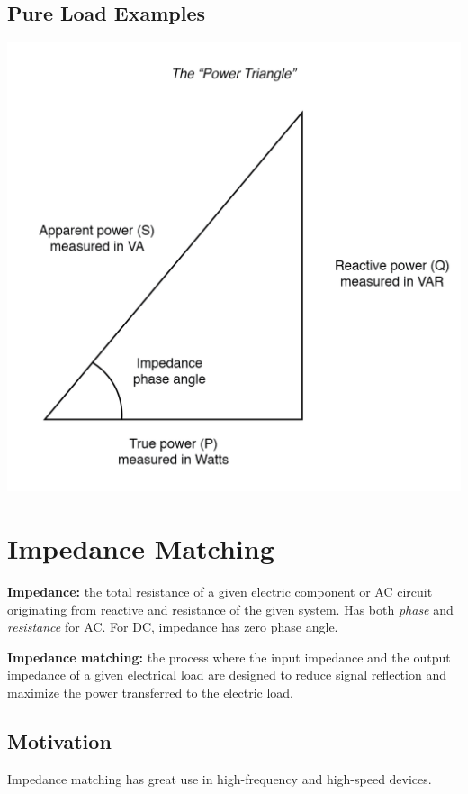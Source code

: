 \subsection{Pure Load Examples}

\begin{center}
    \includegraphics[scale=0.2]{figs/ch01/power_triangle.png}
\end{center}

\section{Impedance Matching}

\begin{pline}
    \item \textbf{Impedance:} the total resistance of a given electric component or AC circuit originating from reactive and resistance of the given system. Has both \textit{phase} and \textit{resistance} for AC. For DC, impedance has zero phase angle.
    \item \textbf{Impedance matching:} the process where the input impedance and the output impedance of a given electrical load are designed to reduce signal reflection and maximize the power transferred to the electric load.
\end{pline}

\subsection{Motivation}
Impedance matching has great use in high-frequency and high-speed devices. 

